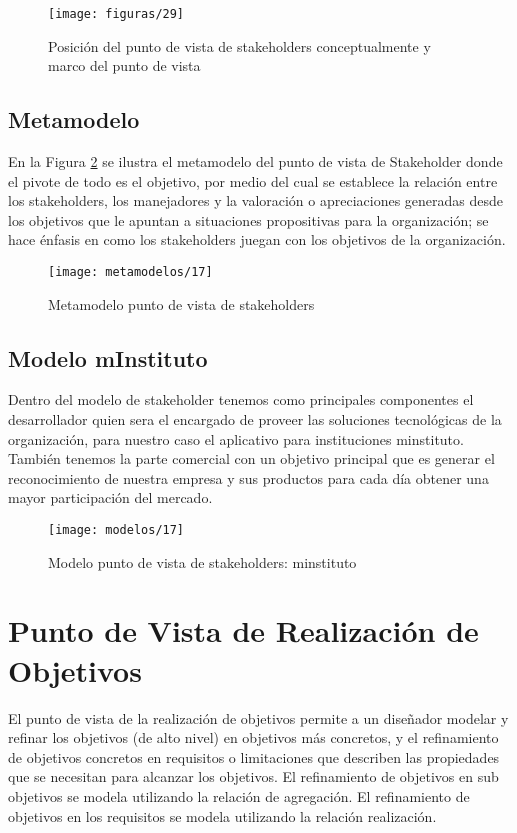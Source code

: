   \begin{figure}[H]
   	\centering
   	\texttt{[image: figuras/29]}
   	\captionsetup{width=.95\textwidth}
   	\caption{Posición del punto de vista de stakeholders conceptualmente y marco del punto de vista \cite{ref9}}
   	\label{figura29}
   \end{figure}
   
   \subsection{Metamodelo}
   En la Figura \ref{metamodelo17} se ilustra el metamodelo del punto de vista de Stakeholder donde el pivote de todo es el objetivo, por medio del cual se establece la relación entre los stakeholders, los manejadores y la valoración o apreciaciones generadas desde los objetivos que le apuntan a situaciones propositivas para la organización; se hace énfasis en como los stakeholders juegan con los objetivos de la organización. \cite{ref9}
   
   \begin{figure}[H]
   	\centering
   	\texttt{[image: metamodelos/17]}
   	\captionsetup{width=.95\textwidth}
   	\caption{Metamodelo punto de vista de stakeholders \cite{ref9}}
   	\label{metamodelo17}
   \end{figure}
   
   \subsection{Modelo mInstituto}
   Dentro del modelo de stakeholder tenemos como principales componentes el desarrollador quien sera el encargado de proveer las soluciones tecnológicas de la organización, para nuestro caso el aplicativo para instituciones minstituto. También tenemos la parte comercial con un objetivo principal que es generar el reconocimiento de nuestra empresa y sus productos para cada día obtener una mayor participación del mercado.
   
   \begin{figure}[H]
   	\centering
   	\texttt{[image: modelos/17]}
   	\captionsetup{width=.95\textwidth}
   	\caption{Modelo punto de vista de stakeholders: minstituto}
   	\label{modelo17}
   \end{figure}
   
\section{Punto de Vista de Realización de Objetivos}
El punto de vista de la realización de objetivos permite a un diseñador modelar y refinar los objetivos (de alto nivel) en objetivos más concretos, y el refinamiento de objetivos concretos en requisitos o limitaciones que describen las propiedades que se necesitan para alcanzar los objetivos. El refinamiento de objetivos en sub objetivos se modela utilizando la relación de agregación. El refinamiento de objetivos en los requisitos se modela utilizando la relación realización. \cite{ref9}
      
